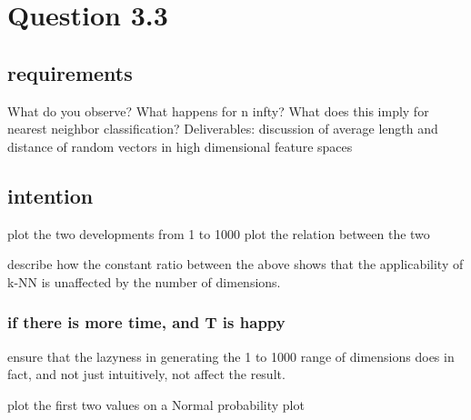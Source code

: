 \section*{Question 3.3}
\subsection*{requirements}
What do you observe? What happens for n  infty? What does this imply for nearest neighbor classification?
Deliverables: discussion of average length and distance of random vectors in high dimensional feature spaces

\subsection*{intention}
plot the two developments from 1 to 1000
plot the relation between the two 

describe how the constant ratio between the above shows that the applicability of k-NN is unaffected by the number of dimensions.

\subsubsection*{if there is more time, and T is happy}
ensure that the lazyness in generating the 1 to 1000 range of dimensions does
in fact, and not just intuitively, not affect the result.

plot the first two values on a Normal probability plot
